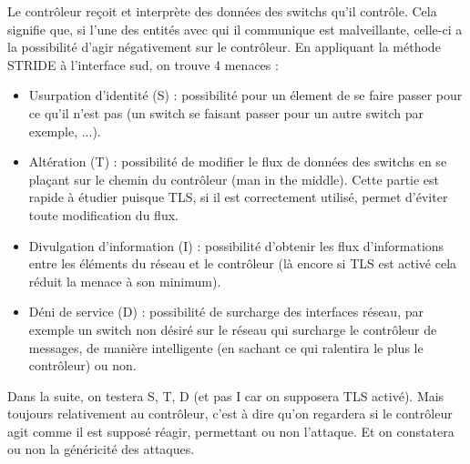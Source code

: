 Le contrôleur reçoit et interprète des données des switchs qu'il contrôle. Cela signifie que, si l'une des entités avec qui il communique est malveillante, celle-ci a la possibilité d'agir négativement sur le contrôleur.
En appliquant la méthode STRIDE à l'interface sud, on trouve 4 menaces :

\begin{itemize}

\item Usurpation d'identité (S) : possibilité pour un élement de se faire passer pour ce qu’il n’est pas (un switch se faisant passer pour un autre switch par exemple, ...).

\item Altération (T) : possibilité de modifier le flux de données des switchs en se plaçant sur le chemin du contrôleur (man in the middle). Cette partie est rapide à étudier puisque TLS, si il est correctement utilisé, permet d’éviter toute modification du flux.

\item Divulgation d'information (I) : possibilité d’obtenir les flux d’informations entre les éléments du réseau et le contrôleur (là encore si TLS est activé cela réduit la menace à son minimum).

\item Déni de service (D) : possibilité de surcharge des interfaces réseau, par exemple un switch non désiré sur le réseau qui surcharge le contrôleur de messages, de manière intelligente (en sachant ce qui ralentira le plus le contrôleur) ou non.

\end{itemize}

Dans la suite, on testera S, T, D (et pas I car on supposera TLS activé). Mais toujours relativement au contrôleur, c'est à dire qu'on regardera si le contrôleur agit comme il est supposé réagir, permettant ou non l'attaque. Et on constatera ou non la généricité des attaques.
